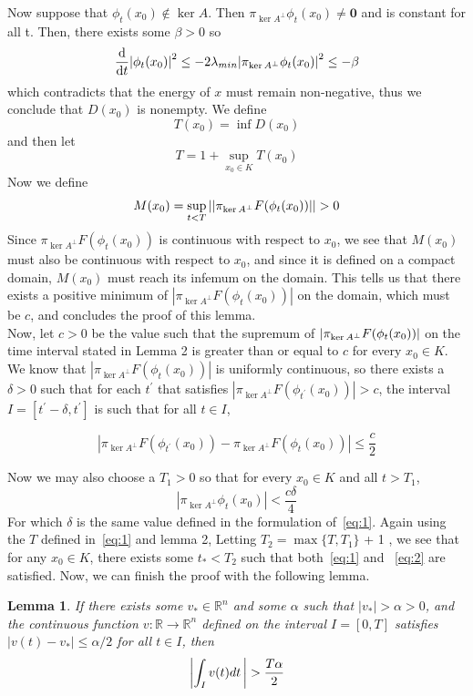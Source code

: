 \documentclass[11pt]{article}
\newtheorem{lemma}{Lemma}
\newcommand{\R}{\mathbb{R}}
\begin{document}
Now suppose that $\phi_t(x_0) \notin \ker A$. Then $\pi_{\ker A^{\perp}}\phi_t(x_0) \neq \mathbf{0}$ and is constant for all t. Then, there exists some $\beta > 0$ so $$\dv{}{t}\abs{\phi_t(x_0)}^2 \leq -2\lambda_{min}\abs{\pi_{\ker A^{\perp}}\phi_t(x_0)}^2 \leq -\beta$$ which contradicts that the energy of $x$ must remain non-negative, thus we conclude that $D(x_0)$ is nonempty. We define $$T(x_0) = \inf D(x_0)$$ and then let $$T = 1 + \sup _{x_0 \in K}T(x_0)$$ Now we define $$M(x_0) = \sup _{t < T}\abs{\abs{\pi_{\ker A^{\perp}}F(\phi_t(x_0))}} > 0$$ Since $\pi_{\ker A^{\perp}}F(\phi_t(x_0))$ is continuous with respect to $x_0$, we see that $M(x_0)$ must also be continuous with respect to $x_0$, and since it is defined on a compact domain, $M(x_0)$ must reach its infemum on the domain. This tells us that there exists a positive minimum of $|\pi_{\ker A^{\perp}}F(\phi_t(x_0))|$ on the domain, which must be $c$, and concludes the proof of this lemma. \\


Now, let $c > 0$ be the value such that the supremum of $\abs{\pi_{\ker A^{\perp}}F(\phi_t(x_0))}$ on the time interval stated in Lemma 2 is greater than or equal to $c$ for every $x_0 \in K$. We know that $|\pi_{\ker A^{\perp}}F(\phi_t(x_0))|$ is uniformly continuous, so there exists a $\delta > 0$ such that for each $t^{\prime}$ that satisfies $|\pi_{\ker A^{\perp}}F(\phi_{t^{\prime}}(x_0))| > c$, the interval $I = [t^{\prime} - \delta, t^{\prime}]$ is such that for all $t \in I$, 

\begin{equation}\label{eq:1}
    |\pi_{\ker A^{\perp}}F(\phi_{t^{\prime}}(x_0)) - \pi_{\ker A^{\perp}}F(\phi_t(x_0))| \leq \frac{c}{2}
\end{equation}

Now we may also choose a $T_1 > 0$ so that for every $x_0 \in K$ and all $t > T_1$, 
\begin{equation}\label{eq:2}
    |\pi_{\ker A ^{\perp}}\phi_t(x_0)| < \frac{c\delta}{4}
\end{equation}
For which $\delta$ is the same value defined in the formulation of~\eqref{eq:1}. Again using the $T$ defined in~\eqref{eq:1} and lemma 2, Letting $T_2 = \max\{T, T_1\}$ + 1 , we see that for any $x_0 \in K$, there exists some $t_* < T_2$ such that both~\eqref{eq:1} and ~\eqref{eq:2} are satisfied. Now, we can finish the proof with the following lemma.

\begin{lemma}
    If there exists some $v_* \in \R^n$ and some $\alpha$ such that $|v_*| > \alpha > 0$, and the continuous function $v: \R \rightarrow \R^n$ defined on the interval $I = [0, T]$ satisfies $|v(t) - v_*| \leq \alpha / 2$ for all $t \in I$, then $$\abs{\int _I v(t)dt\,} > \frac{T\alpha}{2}$$
\end{lemma}
\end{document}
